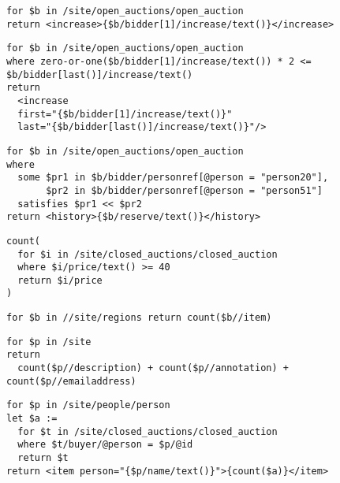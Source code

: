 \begin{lstlisting}[caption=Test query 2., frame=single, label=listing_test_query_2]
for $b in /site/open_auctions/open_auction
return <increase>{$b/bidder[1]/increase/text()}</increase>
\end{lstlisting}

\begin{lstlisting}[caption=Test query 3., frame=single, label=listing_test_query_3]
for $b in /site/open_auctions/open_auction
where zero-or-one($b/bidder[1]/increase/text()) * 2 <= $b/bidder[last()]/increase/text()
return
  <increase
  first="{$b/bidder[1]/increase/text()}"
  last="{$b/bidder[last()]/increase/text()}"/>
\end{lstlisting}

\begin{lstlisting}[float=htpb, caption=Test query 4., frame=single, label=listing_test_query_4]
for $b in /site/open_auctions/open_auction
where
  some $pr1 in $b/bidder/personref[@person = "person20"],
       $pr2 in $b/bidder/personref[@person = "person51"]
  satisfies $pr1 << $pr2
return <history>{$b/reserve/text()}</history>
\end{lstlisting}

\begin{lstlisting}[float=htpb, caption=Test query 5., frame=single, label=listing_test_query_5]
count(
  for $i in /site/closed_auctions/closed_auction
  where $i/price/text() >= 40
  return $i/price
)
\end{lstlisting}

\begin{lstlisting}[float=htpb, caption=Test query 6., frame=single, label=listing_test_query_6]
for $b in //site/regions return count($b//item)
\end{lstlisting}

\begin{lstlisting}[float=htpb, caption=Test query 7., frame=single, label=listing_test_query_7]
for $p in /site
return
  count($p//description) + count($p//annotation) + count($p//emailaddress)
\end{lstlisting}

\begin{lstlisting}[float=htpb, caption=Test query 8., frame=single, label=listing_test_query_8]
for $p in /site/people/person
let $a :=
  for $t in /site/closed_auctions/closed_auction
  where $t/buyer/@person = $p/@id
  return $t
return <item person="{$p/name/text()}">{count($a)}</item>
\end{lstlisting}

